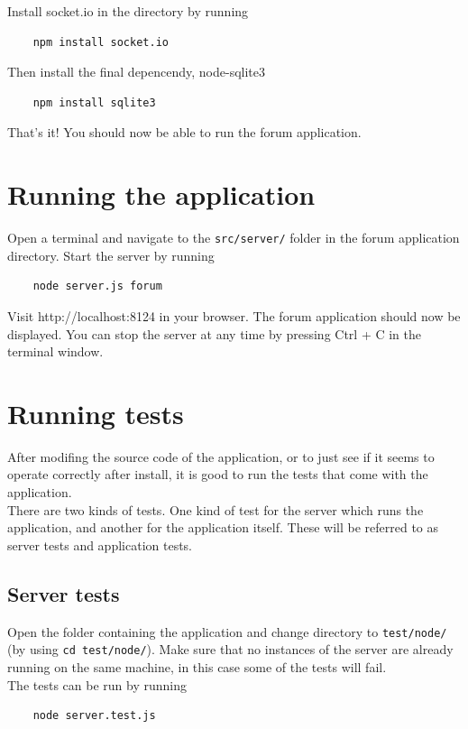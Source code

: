 \documentclass[a4paper, 12pt, titlepage]{article}
\begin{document}
	Install socket.io in the directory by running
	\begin{lstlisting}
	npm install socket.io
	\end{lstlisting}

	Then install the final depencendy, node-sqlite3
	\begin{lstlisting}
	npm install sqlite3
	\end{lstlisting}

	That's it! You should now be able to run the forum application.


	\section{Running the application}
	Open a terminal and navigate to the \lstinline{src/server/} folder in the forum application directory. Start the server by running
	\begin{lstlisting}
	node server.js forum
	\end{lstlisting}

	Visit http://localhost:8124 in your browser. The forum application should now be displayed. You can stop the server at any time by pressing Ctrl + C in the terminal window.


	\section{Running tests}
	After modifing the source code of the application, or to just see if it seems to operate correctly after install, it is good to run the tests that come with the application.\\

	There are two kinds of tests. One kind of test for the server which runs the application, and another for the application itself. These will be referred to as server tests and application tests.

	\subsection{Server tests}
	Open the folder containing the application and change directory to \lstinline{test/node/} (by using \lstinline{cd test/node/}). Make sure that no instances of the server are already running on the same machine, in this case some of the tests will fail.\\

	The tests can be run by running

	\begin{lstlisting}
	node server.test.js
	\end{lstlisting}
\end{document}
